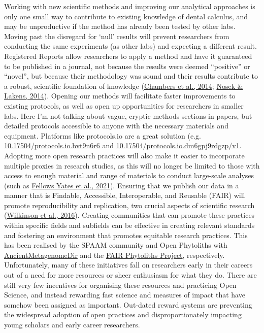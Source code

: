 \documentclass[
  letterpaper,
]{book}
\begin{document}
Working with new scientific methods and improving our analytical
approaches is only one small way to contribute to existing knowledge of
dental calculus, and may be unproductive if the method has already been
tested by other labs. Moving past the disregard for `null' results will
prevent researchers from conducting the same experiments (as other labs)
and expecting a different result. Registered Reports allow researchers
to apply a method and have it guaranteed to be published in a journal,
not because the results were deemed ``positive'' or ``novel'', but
because their methodology was sound and their results contribute to a
robust, scientific foundation of knowledge
(\protect\hyperlink{ref-chambersInsteadPlaying2014}{Chambers et al.,
2014}; \protect\hyperlink{ref-nosekRegisteredReports2014}{Nosek \&
Lakens, 2014}). Opening our methods will facilitate faster improvements
to existing protocols, as well as open up opportunities for researchers
in smaller labs. Here I'm not talking about vague, cryptic methods
sections in papers, but detailed protocols accessible to anyone with the
necessary materials and equipment. Platforms like protocols.io are a
great solution (e.g.~
\href{dx.doi.org/10.17504/protocols.io.bvt9n6r6}{10.17504/protocols.io.bvt9n6r6}
and
\href{dx.doi.org/10.17504/protocols.io.dm6gpj9rdgzp/v1}{10.17504/protocols.io.dm6gpj9rdgzp/v1}.
Adopting more open research practices will also make it easier to
incorporate multiple proxies in research studies, as this will no longer
be limited to those with access to enough material and range of
materials to conduct large-scale analyses (such as
\protect\hyperlink{ref-yatesOralMicrobiome2021}{Fellows Yates et al.,
2021}). Ensuring that we publish our data in a manner that is Findable,
Accessible, Interoperable, and Reusable (FAIR) will promote
reproducibility and replication, two crucial aspects of scientific
research (\protect\hyperlink{ref-wilkinsonFAIRGuiding2016}{Wilkinson et
al., 2016}). Creating communities that can promote these practices
within specific fields and subfields can be effective in creating
relevant standards and fostering an environment that promotes equitable
research practices. This has been realised by the SPAAM community and
Open Phytoliths with
\href{https://zenodo.org/record/7789069}{AncientMetagenomeDir} and the
\href{https://zenodo.org/record/6435441}{FAIR Phytoliths Project},
respectively. Unfortunately, many of these initiatives fall on
researchers early in their careers out of a need for more resources or
sheer enthusiasm for what they do. There are still very few incentives
for organising these resources and practicing Open Science, and instead
rewarding fast science and measures of impact that have somehow been
assigned as important. Out-dated reward systems are preventing the
widespread adoption of open practices and disproportionately impacting
young scholars and early career researchers.
\end{document}

